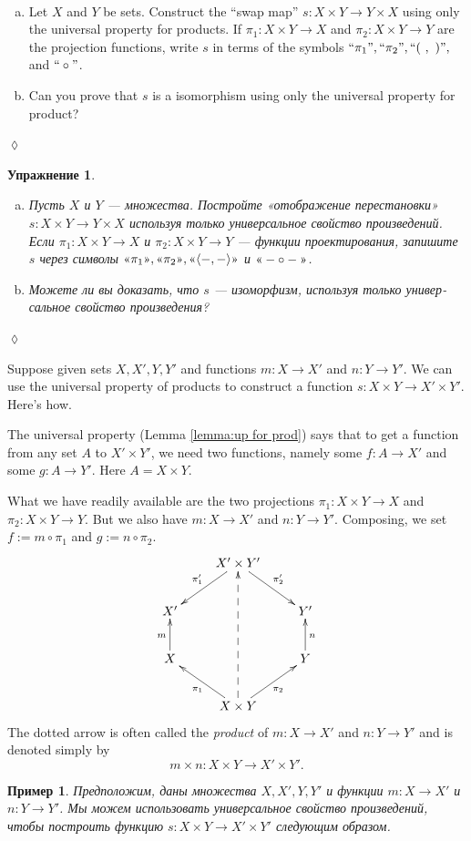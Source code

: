 \documentclass[a4paper]{book}
\def\tn{\textnormal}
\newcommand{\qtE}[1]{\tn{“}#1\tn{”}}
\newcommand{\qtR}[1]{\tn{«}#1\tn{»}}
\def\to{\rightarrow}
\def\taking{\colon}
\def\la{\langle}
\def\ra{\rangle}
\newcommand{\prodmap}[2]{\la#1,#2\ra}
\theoremstyle{myth}
\newtheorem{exampleENG}[envENG]{\begin{english}Example\end{english}}
\newtheorem{excENG}[envENG]{\begin{english}Exercise\end{english}}
\newenvironment{exerciseENG}{\begin{excENG}}{\hspace*{\fill}$\lozenge$\end{excENG}}
\newtheorem{exampleRUS}[envRUS]{Пример}
\newtheorem{excRUS}[envRUS]{Упражнение}
\newenvironment{exerciseRUS}{\begin{excRUS}}{\hspace*{\fill}$\lozenge$\end{excRUS}}
\def\sexc{\begin{enumerate}[a.)]\setlength{\itemsep}{.1cm}\setlength{\parskip}{.1cm}\item}
\def\next{\item}
\def\endsexc{\end{enumerate}}
\begin{document}
\begin{russian}
\begin{exerciseENG}~
\sexc Let $X$ and $Y$ be sets. Construct the “swap map” $s\taking X\times Y\to Y\times X$ using only the universal property for products. If $\pi_1\taking X\times Y\to X$ and $\pi_2\taking X\times Y\to Y$ are the projection functions, write $s$ in terms of the symbols $\qtE{\pi_1}, \qtE{\pi_2}, \qtE{(\ ,\ )},$ and $\qtE{\circ}$. 
\next Can you prove that $s$ is a isomorphism using only the universal property for product?
\endsexc
\end{exerciseENG}

\begin{exerciseRUS}~
\sexc Пусть $X$ и $Y$ — множества. Постройте «отображение перестановки» $s\taking X\times Y\to Y\times X$ используя только универсальное свойство произведений. Если $\pi_1\taking X\times Y\to X$ и $\pi_2\taking X\times Y\to Y$ — функции проектирования, запишите $s$ через символы $\qtR{\pi_1}, \qtR{\pi_2}, \qtR{\prodmap{-}{-}}$ и $\qtR{- \circ -}$. 
\next Можете ли вы доказать, что $s$ — изоморфизм, используя только универсальное свойство произведения?
\endsexc
\end{exerciseRUS}

\begin{exampleENG}\label{ex:product to product}
Suppose given sets $X,X', Y, Y'$ and functions $m\taking X\to X'$ and $n\taking Y\to Y'$. We can use the universal property of products to construct a function $s\taking X\times Y\to X'\times Y'$.  Here's how.

The universal property (Lemma \ref{lemma:up for prod}) says that to get a function from any set $A$ to $X'\times Y'$, we need two functions, namely some $f\taking A\to X'$ and some $g\taking A\to Y'$. Here $A=X\times Y$. 

What we have readily available are the two projections $\pi_1\taking X\times Y\to X$ and $\pi_2\taking X\times Y\to Y$. But we also have $m\taking X\to X'$ and $n\taking Y\to Y'$. Composing, we set $f:=m\circ \pi_1$ and $g:=n\circ\pi_2$.
$$\xymatrix{
&X'\times Y'\ar[dl]_{\pi_1'}\ar[dr]^{\pi_2'}\\
X'&&Y'\\
X\ar[u]^m&&Y\ar[u]_n\\
&X\times Y\ar[ul]^{\pi_1}\ar[ur]_{\pi_2}\ar@{-->}[uuu]
}
$$
The dotted arrow is often called the {\em product} of $m\taking X\to X'$ and $n\taking Y\to Y'$ and is denoted simply by 
$$m\times n\taking X\times Y\to X'\times Y'.$$
\end{exampleENG}

\begin{exampleRUS}\label{ex:product to product}
Предположим, даны множества $X, X', Y, Y'$ и функции $m\taking X\to X'$ и $n\taking Y\to Y'$. Мы можем использовать универсальное свойство произведений, чтобы построить функцию $s\taking X\times Y\to X'\times Y'$ следующим образом.


\end{exampleRUS}
\end{russian}
\end{document}
